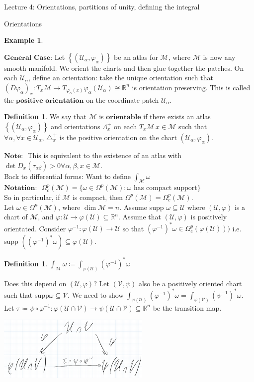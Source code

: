 \documentclass[10pt]{article}
\theoremstyle{plain}
\theoremstyle{definition}
\newtheorem{defn}[thm]{Definition} %
\newtheorem{exmp}[thm]{Example} %
\newcommand{\Notation}{\textbf{Notation: }}
\newcommand{\Note}{\textbf{Note: }}
\newcommand{\Real}{\mathbb{R}}
\newcommand{\man}{\mathcal{M}}
\newcommand{\chartU}{\mathcal{U}}
\newcommand{\chartV}{\mathcal{V}}
\newcommand{\chart}{\varphi}
\newcommand{\alphaatlas}{\left\{(\chartU_\alpha,\chart_\alpha)\right\}}
\newcommand{\trans}{\tau_{\alpha\beta}}
\newcommand{\xman}{x\in\man}
\newcommand{\tang}{T_x\man}
\newcommand{\pformman}[1]{\Omega^{#1}(\man)}
\newcommand{\compactpformman}[1]{\Omega^{#1}_c(\man)}
\begin{document}
\begin{section}{Lecture 4: Orientations, partitions of unity, defining the integral}
\begin{subsection}{Orientations}
\begin{exmp}
\end{exmp}\noindent
$\textbf{General Case:}$ Let $\alphaatlas$ be an atlas for $\man$, where $\man$ is now any smooth manifold. We orient the charts and then glue together the patches. On each $\chartU_\alpha$, define an orientation: take the unique orientation such that $(D\varphi_\alpha)_x : \tang \to T_{\varphi_\alpha(x)} \varphi_\alpha(\chartU_\alpha) \cong \Real^n$ is orientation preserving. This is called the $\textbf{positive orientation}$ on the coordinate patch $\chartU_\alpha$.
\begin{defn}
We say that $\man$ is $\textbf{orientable}$ if there exists an atlas $\alphaatlas$ and orientations $\Lambda_x^+$ on each $\tang\,\xman$ such that $\forall \alpha,\forall x \in \chartU_\alpha, \, \triangle_x^+$ is the positive orientation on the chart $(\chartU_\alpha,\varphi_\alpha)$.
\end{defn}
\noindent
$\Note$ This is equivalent to the existence of an atlas with $\det D_x(\trans)> 0 \forall \alpha, \beta, \xman$.\\
Back to differential forms: Want to define $\int_{\man} \omega$\\
$\Notation$ $\Omega^p_c(\man) = \{\omega \in \pformman{p} : \omega \text{ has compact support} \}$\\
So in particular, if $\man$ is compact, then $\pformman{p} = \compactpformman{p}$. \\
Let $\omega \in \pformman{n}$, where $\dim \man = n$. Assume supp $\omega \subseteq\chartU$ where $(\chartU,\chart)$ is a chart of $\man$, and $\chart : \chartU \to \chart(\chartU)\subseteq\Real^n$. Assume that $(\chartU,\chart)$ is positively orientated. Consider $\chart^{-1} : \chart(\chartU) \to \chartU$ so that $(\chart^{-1})^* \omega \in \Omega_c^p(\chart(\chartU)))  $ i.e. supp $((\chart^{-1})^*\omega)\subseteq\chart(\chartU).$
\begin{defn}
$\int_\man \omega \coloneqq \int_{\chart(\chartU)} (\chart^{-1})^*\omega$
\end{defn}
Does this depend on $(\chartU,\chart)$? Let $(\chartV,\psi)$ also be a positively oriented chart such that supp$\omega \subseteq \chartV$. We need to show $ \int_{\chart(\chartU)} (\chart^{-1})^*\omega =  \int_{\psi(\chartV)} (\psi^{-1})^*\omega$. Let $\tau \coloneqq \psi \circ \varphi ^{-1} : \chart(\chartU\cap \chartV) \to \psi(\chartU\cap\chartV) \subseteq \Real^n$ be the transition map.
\begin{center}\includegraphics[width=0.55\textwidth]{integrationofcharts.png}\end{center}

\end{subsection}
\end{section}
\end{document}
